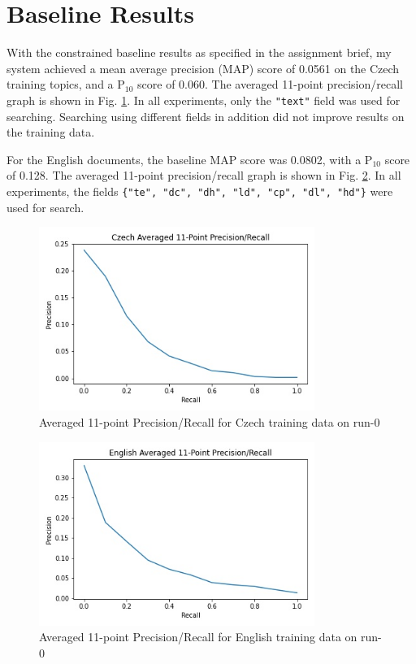 \documentclass[a4paper]{article}
\begin{document}
\section{Baseline Results}
With the constrained baseline results as specified in the assignment brief, my
system achieved a mean average precision (MAP) score of 0.0561 on the Czech
training topics, and a P$_{10}$ score of 0.060. The averaged 11-point
precision/recall graph is shown in Fig. \ref{fig:cs_train}. In all experiments,
only the \texttt{"text"} field was used for searching. Searching using different
fields in addition did not improve results on the training data.

For the English documents, the baseline MAP score was 0.0802, with a P$_{10}$
score of 0.128. The averaged 11-point precision/recall graph is shown in Fig.
\ref{fig:en_train}. In all experiments, the fields \texttt{\{"te", "dc", "dh",
		"ld", "cp",	"dl", "hd"\}} were used for search.

\begin{figure}[htpb]
	\centering
	\includegraphics[width=0.8\textwidth]{plot_run-0_cs_precision_recall.jpg}
	\caption{Averaged 11-point Precision/Recall for Czech training data on run-0}
	\label{fig:cs_train}
\end{figure}

\begin{figure}[htpb]
	\centering
	\includegraphics[width=0.8\textwidth]{plot_run-0_en_precision_recall.jpg}
	\caption{Averaged 11-point Precision/Recall for English training data on run-0}
	\label{fig:en_train}
\end{figure}
\end{document}
